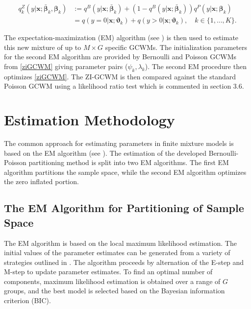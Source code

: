 \documentclass[11pt,letterpaper]{article}
\numberwithin{equation}{section}
\numberwithin{equation}{section}
\numberwithin{equation}{section}
\begin{document}
\begin{align}
q^Z_{k}(y|\bm{x};  \bm{\bar{\beta}}_k,\bm{ \beta}_k) & := q^B(y|\bm{x}; \bm{\bar{\beta}}_k) +(1-  q^B(y|\bm{x}; \bm{\bar{\beta}}_k) ) q^P(y|\bm{x};\bm{\beta}_k) \nonumber \\
& = q(y = 0|\bm{x};\bm{\vartheta}_{k} ) +  q(y > 0|\bm{x} ; \bm{\vartheta}_{k}), \quad k \in \{1 ,\ldots, K \}.
\label{ziGCWM}
\end{align}


The expectation-maximization (EM) algorithm (see \cite{Dempster+Laird+Rubin:1977}) is then used to estimate this new mixture of up to $M \times G$ specific GCWMs. The initialization parameters for the second EM algorithm are provided by Bernoulli and Poisson GCWMs from \eqref{ziGCWM} giving parameter pairs ($ \psi_k,\lambda_k  $). The second EM procedure then optimizes \eqref{ziGCWM}. The ZI-GCWM is then compared against the standard Poisson GCWM using a likelihood ratio test which is commented in section 3.6.

\section{Estimation Methodology}
The common approach for estimating parameters in finite mixture models is based on the EM algorithm (see \cite{McLachlan+Peel:2000}).
The estimation of the developed Bernoulli-Poisson partitioning method is split into two EM algorithms. The first EM algorithm partitions the sample space, while the second EM algorithm optimizes the zero inflated portion.
 \subsection{The EM Algorithm for Partitioning of Sample Space}

The EM algorithm is based on the local  maximum likelihood estimation. %
The initial values of the parameter estimates can be generated from a variety of strategies outlined in \cite{initialPaperGrassiaRef}. %
 The algorithm proceeds by alternation of the E-step and M-step to update parameter estimates. %
To find an optimal number of components, maximum likelihood estimation is obtained over a range of $G$ groups, and the best model is selected based on the Bayesian information criterion (BIC).   %
\end{document}
